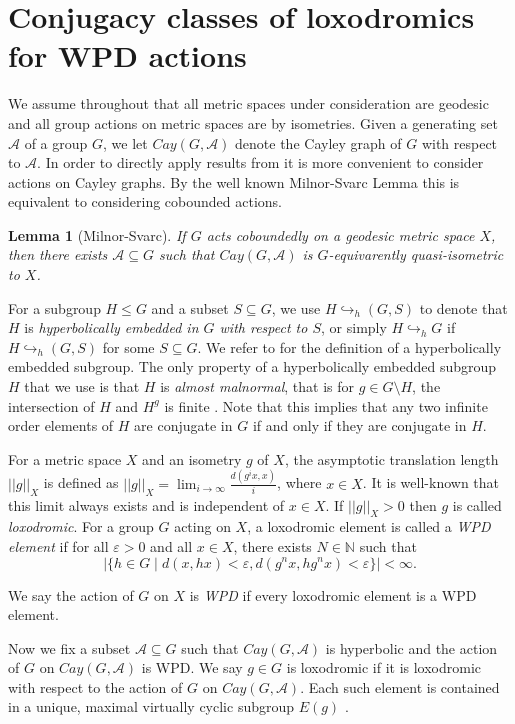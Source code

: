 \documentclass[11pt,letterpaper]{amsart}
\newtheorem{lem}[thm]{Lemma}
\theoremstyle{definition}
\theoremstyle{remark}
\newcommand{\e}{\varepsilon }
\newcommand{\Ga }{Cay(G, \mathcal A)}
\newcommand{\N}{\mathbb N}
\newcommand{\h}{\hookrightarrow _h }
\begin{document}
\section{Conjugacy classes of loxodromics for WPD actions}
We assume throughout that all metric spaces under consideration are geodesic and all group actions on metric spaces are by isometries. Given a generating set $\mathcal{A}$ of a group $G$, we let $\Ga$ denote the Cayley graph of $G$ with respect to $\mathcal A$. In order to directly apply results from \cite{DGO} it is more convenient to consider actions on Cayley graphs. By the well known Milnor-Svarc Lemma this is equivalent to considering cobounded actions.

\begin{lem}[Milnor-Svarc]\label{lem:MS}
If $G$ acts coboundedly on a geodesic metric space $X$, then there exists $\mathcal{A}\subseteq G$ such that $\Ga$ is $G$-equivarently quasi-isometric to $X$.
\end{lem}

For a subgroup $H\leq G$ and  a subset $S\subseteq G$, we use $H\h (G, S)$ to denote that $H$ is \emph{hyperbolically embedded in $G$ with respect to $S$}, or simply $H\h G$ if $H\h(G, S)$ for some $S\subseteq G$. We refer to \cite{DGO} for the definition of a hyperbolically embedded subgroup. The only property of a hyperbolically embedded subgroup $H$ that we use is that $H$ is \emph{almost malnormal}, that is for $g\in G\setminus H$, the intersection of $H$ and $H^g$ is finite \cite[Proposition 4.33]{DGO}. Note that this implies that any two infinite order elements of $H$ are conjugate in $G$ if and only if they are conjugate in $H$.

For a metric space $X$ and an isometry $g$ of $X$, the asymptotic translation length $||g||_X$ is defined as $||g||_X=\lim_{i\to\infty}\frac{d(g^ix,x)}{i}$, where $x\in X$. It is well-known that  this limit always exists and is independent of $x\in X$. If $||g||_X>0$ then $g$ is called \emph{loxodromic}. For a group $G$ acting on $X$, a loxodromic element is called a \emph{WPD element} if for all $\e>0$ and all $x\in X$, there exists $N\in\N$ such that
\[
|\{h\in G\;|\; d(x, hx)<\e, d(g^nx, hg^nx)<\e\}|<\infty.
\]

We say the action of $G$ on $X$ is \emph{WPD} if every loxodromic element is a WPD element.


Now we fix a subset $\mathcal A\subseteq G$ such that $\Ga$ is hyperbolic and the action of $G$ on $\Ga$ is WPD. We say $g\in G$ is loxodromic if it is loxodromic with respect to the action of $G$ on $\Ga$. Each such element is contained in a unique, maximal virtually cyclic subgroup $E(g)$ \cite[Lemma 6.5]{DGO}.
\end{document}
